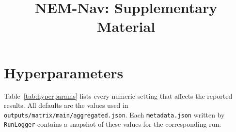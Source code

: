 \documentclass[conference,a4paper,10pt]{IEEEtran}
\begin{document}
\title{NEM-Nav: Supplementary Material}

\author{
}

\maketitle

\appendix

\section{Hyperparameters}
\label{app:hyperparams}

Table~\ref{tab:hyperparams} lists every numeric setting that affects
the reported results. All defaults are the values used in
\texttt{outputs/matrix/main/aggregated.json}. Each \texttt{metadata.json}
written by \texttt{RunLogger} contains a snapshot of these values for
the corresponding run.
\end{document}
